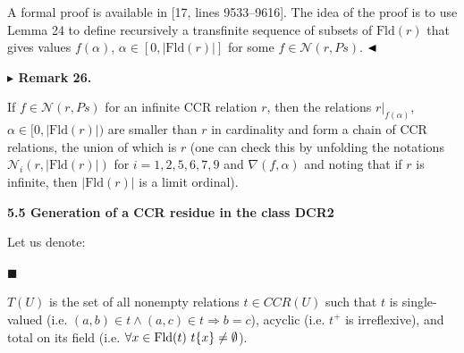  
A formal proof is available in [17, lines 9533–9616]. The idea of the proof is to use Lemma 24 to define recursively a transfinite sequence of subsets of $\mathrm{Fld}(r)$ that gives values $f(\alpha)$, $\alpha\in[0,|\mathrm{Fld}(r)|]$ for some $f\in\mathcal{N}(r,Ps)$. $\hfill\blacktriangleleft$\par
 
 
 
\par\medskip\noindent\textbf{$\blacktriangleright$ Remark 26.}\par
 
 
If $f\in\mathcal{N}(r,Ps)$ for an infinite CCR relation $r$, then the relations $r|_{f(\alpha)}$, $\alpha\in[0,|\mathrm{Fld}(r)|)$ are smaller than $r$ in cardinality and form a chain of CCR relations, the union of which is $r$ (one can check this by unfolding the notations $\mathcal{N}_{i}(r,|\mathrm{Fld}(r)|)$ for $i=1,2,5,6,7,9$ and $\nabla(f,\alpha)$ and noting that if $r$ is infinite, then $|\mathrm{Fld}(r)|$ is a limit ordinal).\par
 
 
 
 
 
 
\par\medskip\noindent\textbf{5.5 Generation of a CCR residue in the class DCR2}\par
 
 
Let us denote:\par
  
\par\noindent  $\blacksquare$ 
 
$T(U)$ is the set of all nonempty relations $t\in CCR(U)$ such that $t$ is single-valued (i.e. $(a,b)\in t\wedge(a,c)\in t\Rightarrow b=c$), acyclic (i.e. $t^{+}$ is irreflexive), and total on its field (i.e. $\forall x\in\mathrm{Fld}(t)\leavevmode\nobreak\ t\{x\}\neq\emptyset$).\par
 
 
